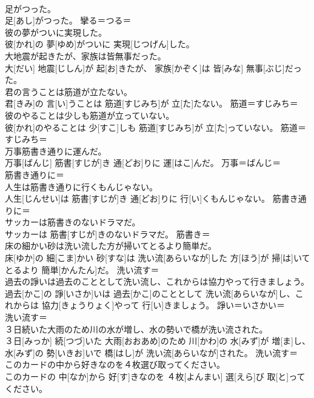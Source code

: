 \documentclass[8pt]{extreport}
\begin{document}
\begin{CJK}{UTF8}{min}
\\	足がつった。	
\\	足[あし]がつった。	攣る＝つる＝ 
\\	彼の夢がついに実現した。	
\\	彼[かれ]の 夢[ゆめ]がついに 実現[じつげん]した。	
\\	大地震が起きたが、家族は皆無事だった。	
\\	大[だい] 地震[じしん]が 起[お]きたが、 家族[かぞく]は 皆[みな] 無事[ぶじ]だった。	
\\	君の言うことは筋道が立たない。	
\\	君[きみ]の 言[い]うことは 筋道[すじみち]が 立[た]たない。	筋道＝すじみち＝ 
\\	彼のやることは少しも筋道が立っていない。	
\\	彼[かれ]のやることは 少[すこ]しも 筋道[すじみち]が 立[た]っていない。	筋道＝すじみち＝ 
\\	万事筋書き通りに運んだ。	
\\	万事[ばんじ] 筋書[すじが]き 通[どお]りに 運[はこ]んだ。	万事＝ばんじ＝ 
\\	筋書き通りに＝ 
\\	人生は筋書き通りに行くもんじゃない。	
\\	人生[じんせい]は 筋書[すじが]き 通[どお]りに 行[い]くもんじゃない。	筋書き通りに＝ 
\\	サッカーは筋書きのないドラマだ。	
\\	サッカーは 筋書[すじが]きのないドラマだ。	筋書き＝ 
\\	床の細かい砂は洗い流した方が掃いてとるより簡単だ。	
\\	床[ゆか]の 細[こま]かい 砂[すな]は 洗い流[あらいなが]した 方[ほう]が 掃[は]いてとるより 簡単[かんたん]だ。	洗い流す＝ 
\\	過去の諍いは過去のこととして洗い流し、これからは協力やって行きましょう。	
\\	過去[かこ]の 諍[いさか]いは 過去[かこ]のこととして 洗い流[あらいなが]し、これからは 協力[きょうりょく]やって 行[い]きましょう。	諍い＝いさかい＝ 
\\	洗い流す＝ 
\\	３日続いた大雨のため川の水が増し、水の勢いで橋が洗い流された。	
\\	３日[みっか] 続[つづ]いた 大雨[おおあめ]のため 川[かわ]の 水[みず]が 増[ま]し、 水[みず]の 勢[いきお]いで 橋[はし]が 洗い流[あらいなが]された。	洗い流す＝ 
\\	このカードの中から好きなのを４枚選び取ってください。	
\\	このカードの 中[なか]から 好[す]きなのを ４枚[よんまい] 選[えら]び 取[と]ってください。	

\end{CJK}
\end{document}
